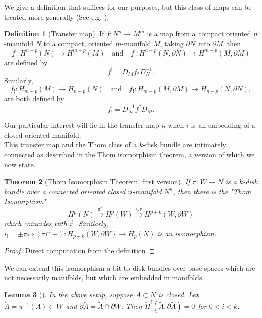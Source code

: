 \documentclass[reqno]{amsart}
\newtheorem{theorem}{Theorem}[section]
\newtheorem{lemma}[theorem]{Lemma}
\theoremstyle{definition}
\newtheorem{definition}[theorem]{Definition}
\theoremstyle{remark}
\begin{document}
We give a definition that suffices for our purposes, but
this class of maps can be treated more generally (See e.g. \cite{Dold}).

\begin{definition}[Transfer map]
    If $f \colon N^{n} \to M^{m}$ is a map from a 
    compact oriented $n$-manifold $N$ to a compact, oriented
    $m$-manifold $M$, taking 
    $\partial N$ into $\partial M$, then
    \[
    f^{!} \colon H^{n-p} (N) \to H^{m-p}(M) \quad
    \text{and} \quad 
    f^{!} \colon H^{n-p}(N, \partial N) \to H^{m-p}(M, \partial M)
    \] 
    are defined by
    \[
    f^{!} = D_M f_* D_N^{-1}.
    \] 
    Similarly,
    \[
    f_! \colon H_{m-p}(M) \to H_{n-p}(N) \quad
    \text{and} \quad
    f_{!} \colon H_{m-p}(M, \partial M) \to 
    H_{n-p}(N, \partial N),
    \] 
    are both defined by
    \[
    f_! = D_N^{-1} f^{*} D_M.
    \] 
\end{definition}

Our particular interest will lie in 
the transfer map $i_!$ when $i$ is an embedding
of a closed oriented manifold.\\
\linebreak
This transfer map and the Thom class of a $k$-disk bundle are
intimately connected as described in the Thom isomorphism theorem, a
version of which we now state.

\begin{theorem}[Thom Isomorphism Theorem, first version]
    If $\pi \colon W \to N$ is a $k$-disk bundle
    over a connected oriented closed $n$-manifold $N^{n}$, then
    there is the "Thom Isomorphism"
    \[
    H^{p}(N) \stackrel{\pi^{*}}{\to} H^{p}(W)
    \stackrel{\cup \tau}{\to} H^{p+k}(W, \partial W)
    \] 
    which coincides with $i^{!}$. Similarly,
    $i_! = \pm \pi_* \circ \left( \tau \cap - \right) \colon
    H_{p+k}\left( W, \partial W \right) \to 
    H_p (N)$ is an isomorphism.
\end{theorem}

\begin{proof}
    Direct computation from the definition \todo{}
\end{proof}

We can extend this isomorphism a bit to
disk bundles over base spaces which are not necessarily manifolds,
but which are embedded in manifolds.






\begin{lemma}[]
    In the above setup, suppose
    $A \subset N$ is closed. Let
    $\tilde{A} = \pi^{-1}(A) \subset W$ and
    $\partial \tilde{A} = \tilde{A} \cap \partial W$.
    Then
    $\check{H}^{i}\left( \tilde{A},
    \partial \tilde{A} \right) = 0$ for 
    $0<i < k$.
\end{lemma}
\end{document}

